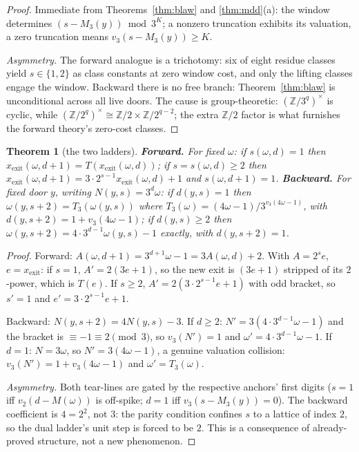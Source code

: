 \documentclass[11pt]{article}
\newtheorem{theorem}{Theorem}[section]
\theoremstyle{remark}
\newcommand{\Z}{\mathbb{Z}}
\newcommand{\vt}[1]{v_2\!\left(#1\right)}
\newcommand{\vth}[1]{v_3\!\left(#1\right)}
\newcommand{\w}{\omega}
\begin{document}
\begin{proof}
Immediate from Theorems~\ref{thm:blaw} and \ref{thm:mdd}(a): the window determines $(s - M_3(y)) \bmod 3^K$; a nonzero truncation exhibits its valuation, a zero truncation means $\vth{s - M_3(y)} \ge K$.

\emph{Asymmetry.} The forward analogue \cite[Thm.~3.6]{paper1} is a trichotomy: six of eight residue classes yield $s \in \{1,2\}$ as class constants at zero window cost, and only the lifting classes engage the window. Backward there is no free branch: Theorem~\ref{thm:blaw} is unconditional across all live doors. The cause is group-theoretic: $(\Z/3^q)^\times$ is cyclic, while $(\Z/2^q)^\times \cong \Z/2 \times \Z/2^{q-2}$; the extra $\Z/2$ factor is what furnishes the forward theory's zero-cost classes.
\end{proof}

\begin{theorem}[the two ladders]\label{thm:ladders}
\textbf{Forward.} For fixed $\w$: if $s(\w,d) = 1$ then $x_{\mathrm{exit}}(\w,d{+}1) = T(x_{\mathrm{exit}}(\w,d))$; if $s = s(\w,d) \ge 2$ then $x_{\mathrm{exit}}(\w,d{+}1) = 3\cdot2^{s-1}x_{\mathrm{exit}}(\w,d) + 1$ and $s(\w,d{+}1) = 1$.
\textbf{Backward.} For fixed door $y$, writing $N(y,s) = 3^d\w$: if $d(y,s) = 1$ then $\w(y,s{+}2) = T_3(\w(y,s))$ where $T_3(\w) = (4\w-1)/3^{\vth{4\w-1}}$, with $d(y,s{+}2) = 1 + \vth{4\w - 1}$; if $d(y,s) \ge 2$ then $\w(y,s{+}2) = 4\cdot3^{d-1}\w(y,s) - 1$ exactly, with $d(y,s{+}2) = 1$.
\end{theorem}

\begin{proof}
Forward: $A(\w,d{+}1) = 3^{d+1}\w - 1 = 3A(\w,d) + 2$. With $A = 2^s e$, $e = x_{\mathrm{exit}}$: if $s = 1$, $A' = 2(3e+1)$, so the new exit is $(3e+1)$ stripped of its $2$-power, which is $T(e)$. If $s \ge 2$, $A' = 2(3\cdot2^{s-1}e + 1)$ with odd bracket, so $s' = 1$ and $e' = 3\cdot2^{s-1}e + 1$.

Backward: $N(y,s{+}2) = 4N(y,s) - 3$. If $d \ge 2$: $N' = 3(4\cdot3^{d-1}\w - 1)$ and the bracket is $\equiv -1 \equiv 2 \pmod 3$, so $\vth{N'} = 1$ and $\w' = 4\cdot3^{d-1}\w - 1$. If $d = 1$: $N = 3\w$, so $N' = 3(4\w - 1)$, a genuine valuation collision: $\vth{N'} = 1 + \vth{4\w-1}$ and $\w' = T_3(\w)$.

\emph{Asymmetry.} Both tear-lines are gated by the respective anchors' first digits ($s = 1$ iff $\vt{d - M(\w)}$ is off-spike; $d = 1$ iff $\vth{s - M_3(y)} = 0$). The backward coefficient is $4 = 2^2$, not $3$: the parity condition confines $s$ to a lattice of index $2$, so the dual ladder's unit step is forced to be $2$. This is a consequence of already-proved structure, not a new phenomenon.
\end{proof}
\end{document}
